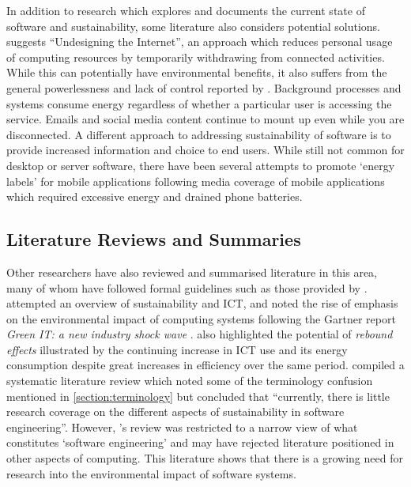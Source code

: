 In addition to research which explores and documents the current state of software and sustainability, some literature also considers potential solutions. \citet{Widdicks2018} suggests \enquote{Undesigning the Internet}, an approach which reduces personal usage of computing resources by temporarily withdrawing from connected activities. While this can potentially have environmental benefits, it also suffers from the general powerlessness and lack of control reported by \citet{Tocze2022a}. Background processes and systems consume energy regardless of whether a particular user is accessing the service. Emails and social media content continue to mount up even while you are disconnected. A different approach to addressing sustainability of software is to provide increased information and choice to end users. While still not common for desktop or server software, there have been several attempts to promote `energy labels' for mobile applications \citep{Wilke2012} \citep{Baek2018} \citep{Behrouz2015} following media coverage of mobile applications which required excessive energy and drained phone batteries.

\subsection{Literature Reviews and Summaries}
\label{literature:summaries}

Other researchers have also reviewed and summarised literature in this area, many of whom have followed formal guidelines such as those provided by \citet{Kitchenham2007}. \citet{Hilty2011} attempted an overview of sustainability and ICT, and noted the rise of emphasis on the environmental impact of computing systems following the Gartner report \emph{Green IT: a new industry shock wave} \citep{Mingay2007}. \citeauthor{Hilty2011} also highlighted the potential of \emph{rebound effects} illustrated by the continuing increase in ICT use and its energy consumption despite great increases in efficiency over the same period. \citet{Penzenstadler2012} compiled a systematic literature review which noted some of the terminology confusion mentioned in \autoref{section:terminology} but concluded that \enquote{currently, there is little research coverage on the different aspects of sustainability in software engineering}. However, \citeauthor{Penzenstadler2012}'s review was restricted to a narrow view of what constitutes `software engineering' and may have rejected literature positioned in other aspects of computing. This literature shows that there is a growing need for research into the environmental impact of software systems.

